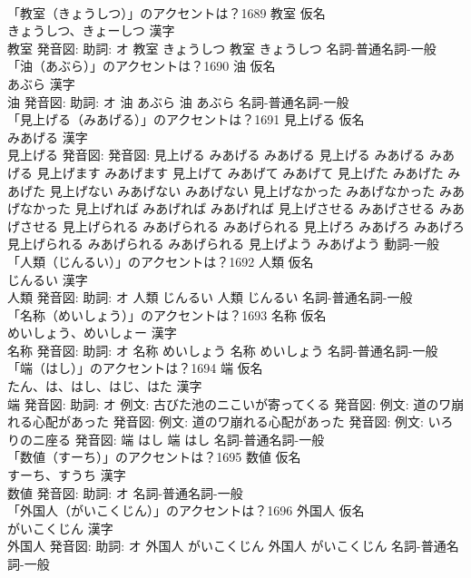 \documentclass[8pt]{extreport}
\begin{document}
\begin{CJK}{UTF8}{min}
\\	「教室（きょうしつ）」のアクセントは？1689	教室 仮名　
\\	きょうしつ、きょーしつ 漢字　
\\	教室 発音図: 助詞: オ	教室 きょうしつ		教室 きょうしつ				名詞-普通名詞-一般 
\\	「油（あぶら）」のアクセントは？1690	油 仮名　
\\	あぶら 漢字　
\\	油 発音図: 助詞: オ	油 あぶら		油 あぶら				名詞-普通名詞-一般 
\\	「見上げる（みあげる）」のアクセントは？1691	見上げる 仮名　
\\	みあげる 漢字　
\\	見上げる 発音図: 発音図:	見上げる みあげる みあげる		見上げる みあげる みあげる 見上げます みあげます 見上げて みあげて みあげて 見上げた みあげた みあげた 見上げない みあげない みあげない 見上げなかった みあげなかった みあげなかった 見上げれば みあげれば みあげれば 見上げさせる みあげさせる みあげさせる 見上げられる みあげられる みあげられる 見上げろ みあげろ みあげろ 見上げられる みあげられる みあげられる 見上げよう みあげよう				動詞-一般 
\\	「人類（じんるい）」のアクセントは？1692	人類 仮名　
\\	じんるい 漢字　
\\	人類 発音図: 助詞: オ	人類 じんるい		人類 じんるい				名詞-普通名詞-一般 
\\	「名称（めいしょう）」のアクセントは？1693	名称 仮名　
\\	めいしょう、めいしょー 漢字　
\\	名称 発音図: 助詞: オ	名称 めいしょう		名称 めいしょう				名詞-普通名詞-一般 
\\	「端（はし）」のアクセントは？1694	端 仮名　
\\	たん、は、はし、はじ、はた 漢字　
\\	端 発音図: 助詞: オ 例文: 古びた池のニこいが寄ってくる 発音図: 例文: 道のワ崩れる心配があった 発音図: 例文: 道のワ崩れる心配があった 発音図: 例文: いろりのニ座る 発音図:	端 はし		端 はし				名詞-普通名詞-一般 
\\	「数値（すーち）」のアクセントは？1695	数値 仮名　
\\	すーち、すうち 漢字　
\\	数値 発音図: 助詞: オ							名詞-普通名詞-一般 
\\	「外国人（がいこくじん）」のアクセントは？1696	外国人 仮名　
\\	がいこくじん 漢字　
\\	外国人 発音図: 助詞: オ	外国人 がいこくじん		外国人 がいこくじん				名詞-普通名詞-一般 

\end{CJK}
\end{document}
